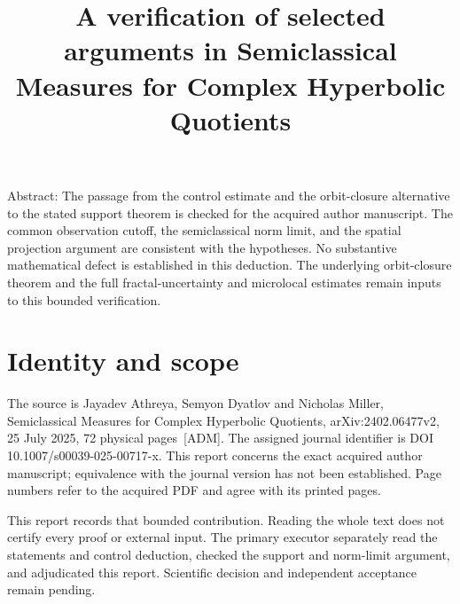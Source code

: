 \documentclass[10pt]{article}
\title{A verification of selected arguments in
Semiclassical Measures for Complex Hyperbolic Quotients}
\author{}
\date{}
\begin{document}
\maketitle
Abstract: The passage from the control estimate and the orbit-closure alternative to the stated support theorem is checked for the acquired author manuscript. The common observation cutoff, the semiclassical norm limit, and the spatial projection argument are consistent with the hypotheses. No substantive mathematical defect is established in this deduction. The underlying orbit-closure theorem and the full fractal-uncertainty and microlocal estimates remain inputs to this bounded verification.\par
\section*{Identity and scope}
The source is Jayadev Athreya, Semyon Dyatlov and Nicholas Miller, Semiclassical Measures for Complex Hyperbolic Quotients, arXiv:2402.06477v2, 25 July 2025, 72 physical pages [ADM]. The assigned journal identifier is DOI 10.1007/s00039-025-00717-x. This report concerns the exact acquired author manuscript; equivalence with the journal version has not been established. Page numbers refer to the acquired PDF and agree with its printed pages.\par
This report records that bounded contribution. Reading the whole text does not certify every proof or external input. The primary executor separately read the statements and control deduction, checked the support and norm-limit argument, and adjudicated this report. Scientific decision and independent acceptance remain pending.\par
\end{document}
